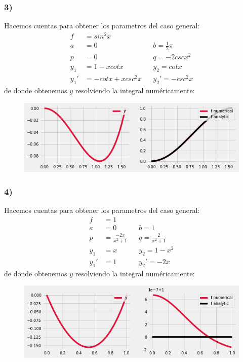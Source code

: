 \documentclass{article}
\begin{document}
\begin{tcolorbox}
    \subsubsection*{3)}
    Hacemos cuentas para obtener los parametros del caso general:
    \begin{align*}
        f&= sin^2x \\
        a&=0 &&b=\frac{1}{2}\pi \\
        p&=0 &&q= -2cscx^2 \\
        y_1 &= 1-xcotx  &&y_2= cotx \\
        y_1' &= -cotx + xcsc^2x  &&y_2'= -csc^2x 
    \end{align*}
    de donde obtenemos $y$ resolviendo la integral numéricamente:
    \begin{figure}[H]
        \centering
        \includegraphics[scale=0.7]{images/p3_3.png}
    \end{figure}

    \subsubsection*{4)}
    Hacemos cuentas para obtener los parametros del caso general:
    \begin{align*}
        f&= 1 \\
        a &=0 &&b=1 \\
        p &=\frac{-2x}{x^2+1} &&q= \frac{2}{x^2+1} \\
        y_1 &=x  &&y_2= 1-x^2 \\
        y_1' &=1 &&y_2'= -2x  
    \end{align*}
    de donde obtenemos $y$ resolviendo la integral numéricamente:
    \begin{figure}[H]
        \centering
        \includegraphics[scale=0.7]{images/p3_4.png}
    \end{figure}

\end{tcolorbox}
\end{document}

